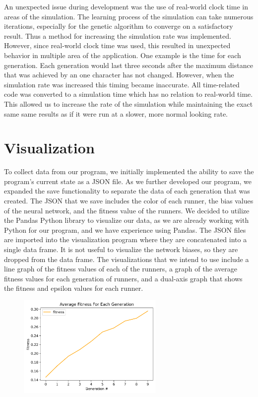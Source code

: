 \documentclass[letterpaper]{article} %
\begin{document}
\par An unexpected issue during development was the use of real-world clock time in areas of the simulation. The learning process of the simulation can take numerous iterations, especially for the genetic algorithm to converge on a satisfactory result. Thus a method for increasing the simulation rate was implemented. However, since real-world clock time was used, this resulted in unexpected behavior in multiple area of the application. One example is the time for each generation. Each generation would last three seconds after the maximum distance that was achieved by an one character has not changed. However, when the simulation rate was increased this timing became inaccurate. All time-related code was converted to a simulation time which has no relation to real-world time. This allowed us to increase the rate of the simulation while maintaining the exact same same results as if it were run at a slower, more normal looking rate.

\section{Visualization}

\par To collect data from our program, we initially implemented the ability to save the program's current state as a JSON file. As we further developed our program, we expanded the save functionality to separate the data of each generation that was created. The JSON that we save includes the color of each runner, the bias values of the neural network, and the fitness value of the runners. We decided to utilize the Pandas Python library to visualize our data, as we are already working with Python for our program, and we have experience using Pandas. The JSON files are imported into the visualization program where they are concatenated into a single data frame. It is not useful to visualize the network biases, so they are dropped from the data frame. The visualizations that we intend to use include a line graph of the fitness values of each of the runners, a graph of the average fitness values for each generation of runners, and a dual-axis graph that shows the fitness and epsilon values for each runner.

\begin{figure}[h]
\centering
\includegraphics[width=7cm]{avg_fitness_per_gen.png}
\end{figure}
\end{document}
